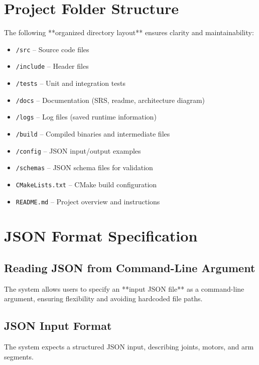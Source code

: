 \documentclass{article}
\begin{document}
\section{Project Folder Structure}
The following **organized directory layout** ensures clarity and maintainability:

\begin{itemize}
    \item \texttt{/src} – Source code files
    \item \texttt{/include} – Header files
    \item \texttt{/tests} – Unit and integration tests
    \item \texttt{/docs} – Documentation (SRS, readme, architecture diagram)
    \item \texttt{/logs} – Log files (saved runtime information)
    \item \texttt{/build} – Compiled binaries and intermediate files
    \item \texttt{/config} – JSON input/output examples
    \item \texttt{/schemas} – JSON schema files for validation
    \item \texttt{CMakeLists.txt} – CMake build configuration
    \item \texttt{README.md} – Project overview and instructions
\end{itemize}

\section{JSON Format Specification}
\subsection{Reading JSON from Command-Line Argument}
The system allows users to specify an **input JSON file** as a command-line argument, ensuring flexibility and avoiding hardcoded file paths.

\subsection{JSON Input Format}
The system expects a structured JSON input, describing joints, motors, and arm segments.
\end{document}
